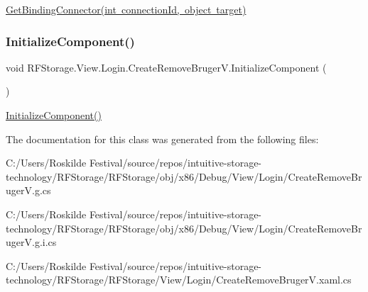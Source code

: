 \mbox{\hyperlink{class_r_f_storage_1_1_view_1_1_login_1_1_create_remove_bruger_v_ab7e9d9835e1b23bd9e7fdc5d3fa6e032}{Get\+Binding\+Connector(int connection\+Id, object target)}} 

\mbox{\label{class_r_f_storage_1_1_view_1_1_login_1_1_create_remove_bruger_v_a42c2c1e840fc876877b68fb4798b98ea}} 
\subsubsection{\texorpdfstring{InitializeComponent()}{InitializeComponent()}}
{\footnotesize\ttfamily void R\+F\+Storage.\+View.\+Login.\+Create\+Remove\+Bruger\+V.\+Initialize\+Component (\begin{DoxyParamCaption}{ }\end{DoxyParamCaption})}



\mbox{\hyperlink{class_r_f_storage_1_1_view_1_1_login_1_1_create_remove_bruger_v_a42c2c1e840fc876877b68fb4798b98ea}{Initialize\+Component()}} 



The documentation for this class was generated from the following files\+:\begin{DoxyCompactItemize}
\item 
C\+:/\+Users/\+Roskilde Festival/source/repos/intuitive-\/storage-\/technology/\+R\+F\+Storage/\+R\+F\+Storage/obj/x86/\+Debug/\+View/\+Login/Create\+Remove\+Bruger\+V.\+g.\+cs\item 
C\+:/\+Users/\+Roskilde Festival/source/repos/intuitive-\/storage-\/technology/\+R\+F\+Storage/\+R\+F\+Storage/obj/x86/\+Debug/\+View/\+Login/Create\+Remove\+Bruger\+V.\+g.\+i.\+cs\item 
C\+:/\+Users/\+Roskilde Festival/source/repos/intuitive-\/storage-\/technology/\+R\+F\+Storage/\+R\+F\+Storage/\+View/\+Login/Create\+Remove\+Bruger\+V.\+xaml.\+cs\end{DoxyCompactItemize}
